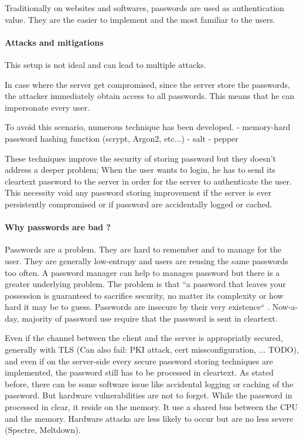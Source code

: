 \documentclass[../report.tex]{subfiles}
\begin{document}
Traditionally on websites and softwares, passwords are used as authentication value. They are the easier to implement and the most familiar to the users.



\paragraph{Attacks and mitigations}
This setup is not ideal and can lead to multiple attacks.

In case where the server get compromised, since the server store the passwords, the attacker immediately obtain access to all passwords. This means that he can impersonate every user.

To avoid this scenario, numerous technique has been developed.
- memory-hard password hashing function (scrypt, Argon2, etc...)
- salt
- pepper

These techniques improve the security of storing password but they doesn't address a deeper problem;
When the user wants to login, he has to send its cleartext password to the server in order for the server to authenticate the user. This necessity void any password storing improvement if the server is ever persistently compromised or if password are accidentally logged or cached.


\paragraph{Why passwords are bad ?}
Passwords are a problem. They are hard to remember and to manage for the user. They are generally low-entropy and users are reusing the same passwords too often. A password manager can help to manages password but there is a greater underlying problem.
The problem is that ``a password that leaves your possession is guaranteed to sacrifice security, no matter its complexity or how hard it may be to guess. Passwords are insecure by their very existence`` \cite{PAKE_Cloudflare_blog}. %
Now-a-day, majority of password use require that the password is sent in cleartext.

Even if the channel between the client and the server is appropriatly secured, generally with TLS (Can also fail: PKI attack, cert missconfiguration, ... TODO), and even if on the server-side every secure password storing techniques are implemented, the password still has to be processed in cleartext.
As stated before, there can be some software issue like accidental logging or caching of the password. But hardware vulnerabilities are not to forget. While the password in processed in clear, it reside on the memory. It use a shared bus between the CPU and the memory. Hardware attacks are less likely to occur but are no less severe (Spectre, Meltdown).
\end{document}

